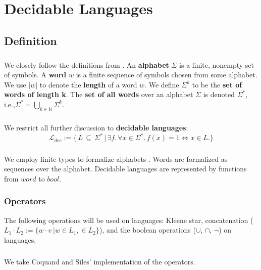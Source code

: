 \chapter{Decidable Languages}

\section{Definition}
\paragraph{}
We closely follow the definitions from \cite{DBLP:books/daglib/0011126}.
An \textbf{alphabet} $\Sigma$ is a finite, nonempty set of symbols. 
A \textbf{word} $w$ is a finite sequence of symbols chosen from some alphabet. 
We use $|w|$ to denote the \textbf{length} of a word $w$. 
We define $\Sigma^k$ to be the \textbf{set of words of length k}.
The \textbf{set of all words} over an alphabet $\Sigma$ is denoted $\Sigma^*$, i.e.,$\Sigma^* = \bigcup_{k \in \mathbb{N}} \Sigma^k$.

\paragraph{} We restrict all further discussion to \textbf{decidable languages}:
\[ \mathcal{L}_{dec} := \{ \, L \, \subseteq \, \Sigma^* \, 
\vert \, \exists f. \, \forall x \in \Sigma^*. \, f(x) = 1 \Leftrightarrow  x \in L. \} \] 

\paragraph{} 
We employ finite types to formalize alphabets . 
Words are formalized as sequences over the alphabet.
Decidable languages are represented by functions from $word$ to $bool$.

\subsection{Operators}
%
The following operations will be used on languages: Kleene star, concatenation ($L_1 \cdot L_2 := \{w \cdot v\ \vert w \in L_1,  \in L_2\}$), and the boolean operations ($\cup$, $\cap$, $\neg$) on languages.

\paragraph{}
We take Coquand and Siles' implementation of the operators.

